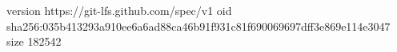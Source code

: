 version https://git-lfs.github.com/spec/v1
oid sha256:035b413293a910ee6a6ad88ca46b91f931c81f690069697dff3e869e114e3047
size 182542
